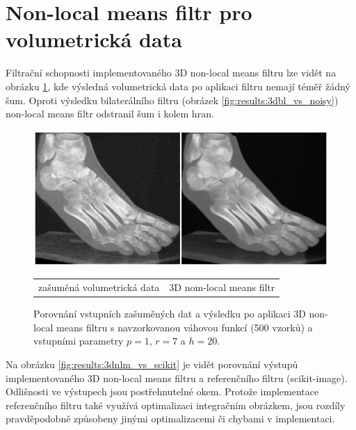 \section{Non-local means filtr pro volumetrická data}
\label{sec:results:nlm}
Filtrační schopnosti implementovaného 3D non-local means filtru lze vidět na obrázku \ref{fig:results:3dnlm_vs_noisy}, kde výsledná volumetrická data po aplikaci filtru nemají téměř žádný šum. Oproti výsledku bilaterálního filtru (obrázek \ref{fig:results:3dbl_vs_noisy}) non-local means filtr odstranil šum i kolem hran.

\begin{figure} [H]
    \centering
    \label{fig:results:3dnlm_vs_noisy}
    \includegraphics[width=1\textwidth]{figures/3dnlm_vs_noisy.png}
    \begin{tabularx}{1\textwidth}{>{\centering}X>{\centering}X}
        zašuměná volumetrická data & 3D nom-local means filtr
    \end{tabularx}
    \caption{Porovnání vstupních zašuměných dat a výsledku po aplikaci 3D non-local means filtru s navzorkovanou váhovou funkcí (500 vzorků) a vstupními parametry $p=1$, $r=7$ a $h=20$.}
\end{figure}

Na obrázku \ref{fig:results:3dnlm_vs_scikit} je vidět porovnání výstupů implementovaného 3D non-local means filtru a referenčního filtru (scikit-image). Odlišnosti ve výstupech jsou postřehnutelné okem. Protože implementace referenčního filtru také využívá optimalizaci integračním obrázkem, jsou rozdíly pravděpodobně způsobeny jinými optimalizacemi či chybami v implementaci.

